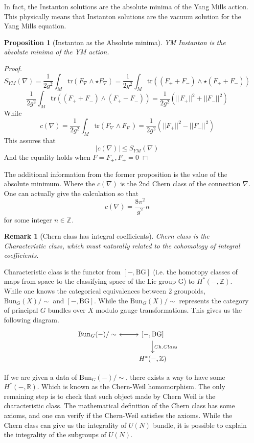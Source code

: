 \documentclass{article}
\newtheorem{prop}{Proposition}
\newtheorem{rem}{Remark}
\begin{document}
In fact, the Instanton solutions are the absolute minima of the Yang Mills action. This physically means that Instanton solutions are the vacuum solution for the Yang Mills equation. 
\begin{prop}[Instanton as the Absolute minima]
    YM Instanton is the absolute minima of the YM action.
\end{prop}
\begin{proof}
    \[
        S_{YM}(\nabla) = \frac{1}{2g^2}\int_M \mathrm{tr}(F_\nabla\wedge \star F_\nabla) = \frac{1}{2g^2}\int_M \mathrm{tr}((F_+ + F_-)\wedge \star (F_+ + F_-))
    \]
    \[
        \frac{1}{2g^2}\int_M \mathrm{tr}((F_+ + F_-)\wedge (F_+ - F_-)) = \frac{1}{2g^2}\left(||F_+||^2 + ||F_-||^2 \right)
    \]
    While 
    \[
        c(\nabla) = \frac{1}{2g^2}\int_M \mathrm{tr}(F_\nabla\wedge F_\nabla) = \frac{1}{2g^2}\left(||F_+||^2 - ||F_-||^2 \right)
    \]
    This assures that
    \[
        |c(\nabla)| \leq S_{YM}(\nabla)
    \]
    And the equality holds when $F=F_{\pm}, F_{\mp}=0$
\end{proof}

The additional information from the former proposition is the value of the absolute minimum. Where the $c(\nabla)$ is the 2nd Chern class of the connection $\nabla$. One can actually give the calculation so that
\[
    c(\nabla) = \frac{8\pi^2}{g^2} n
\]
for some integer $n\in\mathbb{Z}$.

\begin{rem}[Chern class has integral coefficients]
    Chern class is the Characteristic class, which must naturally related to the cohomology of integral coefficients. 
\end{rem}
Characteristic class is the functor from $[-,\mathrm{BG}]$ (i.e. the homotopy classes of maps from space to the classifying space of the Lie group G) to $H^*(-,\mathbb{Z})$. While one knows the categorical equivalences between 2 groupoids, $\mathrm{Bun}_G(X)/\sim$ and $[-,\mathrm{BG}]$. While the $\mathrm{Bun}_G(X)/\sim$ represents the category of principal $G$ bundles over $X$ modulo gauge transformations. This gives us the following diagram.
\[
\begin{tikzcd}
   \mathrm{Bun}_G(-)/\sim \arrow[r] 
    & {[-,\mathrm{BG}]}\arrow[l] \arrow[d, "Ch.Class"] \\
     & {H^*(-,\mathbb{Z})}
\end{tikzcd}
\]

If we are given a data of $\mathrm{Bun}_G(-)/\sim$, there exists a way to have some $H^*(-,\mathbb{R})$. Which is known as the Chern-Weil homomorphism. The only remaining step is to check that such object made by Chern Weil is the characteristic class. The mathematical definition of the Chern class has some axioms, and one can verify if the Chern-Weil satisfies the axioms. While the Chern class can give us the integrality of $U(N)$ bundle, it is possible to explain the integrality of the subgroups of $U(N)$. 
\end{document}
